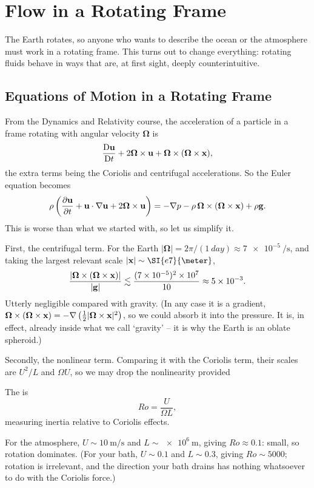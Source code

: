 \documentclass[a4paper]{scrartcl}
\newcommand{\D}{\mathrm{D}}
\newcommand{\Dt}[1]{\frac{\D #1}{\D t}}
\newcommand{\pd}[2]{\frac{\partial #1}{\partial #2}}
\newcommand{\bOm}{\boldsymbol{\Omega}}
\newcommand{\Ro}{\mathit{Ro}}
\begin{document}
\section{Flow in a Rotating Frame}

The Earth rotates, so anyone who wants to describe the ocean or the atmosphere must work in a rotating frame. This turns out to change everything: rotating fluids behave in ways that are, at first sight, deeply counterintuitive.

\subsection{Equations of Motion in a Rotating Frame}

From the Dynamics and Relativity course, the acceleration of a particle in a frame rotating with angular velocity $\bOm$ is
$$
\Dt{\vv u} + 2\bOm\times\vv u + \bOm\times(\bOm\times\vv x),
$$
the extra terms being the Coriolis and centrifugal accelerations. So the Euler equation becomes
$$
\rho\left(\pd{\vv u}{t} + \vv u \cdot \nabla \vv u + 2\bOm\times\vv u\right) = -\nabla p - \rho\, \bOm\times(\bOm\times\vv x) + \rho\vv g.
$$
This is worse than what we started with, so let us simplify it.

First, the centrifugal term. For the Earth $|\bOm| = 2\pi/(\SI{1}{day}) \approx \SI{7e-5}{\per\second}$, and taking the largest relevant scale $|\vv x| \sim \SI{e7}{\meter}$,
$$
\frac{|\bOm\times(\bOm\times \vv x)|}{|\vv g|} \lesssim \frac{(7\times10^{-5})^2 \times 10^7}{10} \approx 5\times 10^{-3}.
$$
Utterly negligible compared with gravity. (In any case it is a gradient, $\bOm\times(\bOm\times\vv x) = -\nabla\left(\tfrac{1}{2}|\bOm\times\vv x|^2\right)$, so we could absorb it into the pressure. It is, in effect, already inside what we call `gravity' -- it is why the Earth is an oblate spheroid.)

Secondly, the nonlinear term. Comparing it with the Coriolis term, their scales are $U^2/L$ and $\Omega U$, so we may drop the nonlinearity provided

\begin{definition}
	The  is
	$$
	\Ro = \frac{U}{\Omega L},
	$$
	measuring inertia relative to Coriolis effects.
\end{definition}

For the atmosphere, $U \sim \SI{10}{\meter\per\second}$ and $L \sim \SI{e6}{\meter}$, giving $\Ro \approx 0.1$: small, so rotation dominates. (For your bath, $U \sim 0.1$ and $L \sim 0.3$, giving $\Ro \sim 5000$; rotation is irrelevant, and the direction your bath drains has nothing whatsoever to do with the Coriolis force.)
\end{document}
